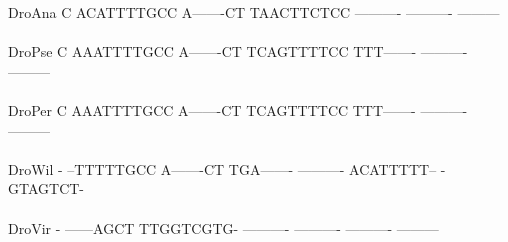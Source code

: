 \documentclass[11pt,twoside,reqno,a4paper]{article}
\begin{document}
{DroAna	C	ACATTTTGCC	A-------CT	TAACTTCTCC	----------	----------	---------\\
\hspace*{7\charwidth}\hspace*{1\charwidth}\hspace*{1\charwidth}\hspace*{1\charwidth}\hspace*{1\charwidth}\hspace*{1\charwidth}\hspace*{1\charwidth}\\
DroPse	C	AAATTTTGCC	A-------CT	TCAGTTTTCC	TTT-------	----------	---------\\
\hspace*{7\charwidth}\hspace*{1\charwidth}\hspace*{1\charwidth}\hspace*{1\charwidth}\hspace*{1\charwidth}\hspace*{1\charwidth}\hspace*{1\charwidth}\\
DroPer	C	AAATTTTGCC	A-------CT	TCAGTTTTCC	TTT-------	----------	---------\\
\hspace*{7\charwidth}\hspace*{1\charwidth}\hspace*{1\charwidth}\hspace*{1\charwidth}\hspace*{1\charwidth}\hspace*{1\charwidth}\hspace*{1\charwidth}\\
DroWil	-	--TTTTTGCC	A-------CT	TGA-------	----------	ACATTTTT--	-GTAGTCT-\\
\hspace*{7\charwidth}\hspace*{1\charwidth}\hspace*{1\charwidth}\hspace*{1\charwidth}\hspace*{1\charwidth}\hspace*{1\charwidth}\hspace*{1\charwidth}\\
DroVir	-	------AGCT	TTGGTCGTG-	----------	----------	----------	---------\\
\hspace*{7\charwidth}\hspace*{1\charwidth}\hspace*{1\charwidth}\hspace*{1\charwidth}\hspace*{1\charwidth}\hspace*{1\charwidth}\hspace*{1\charwidth}\\
}
\end{document}
